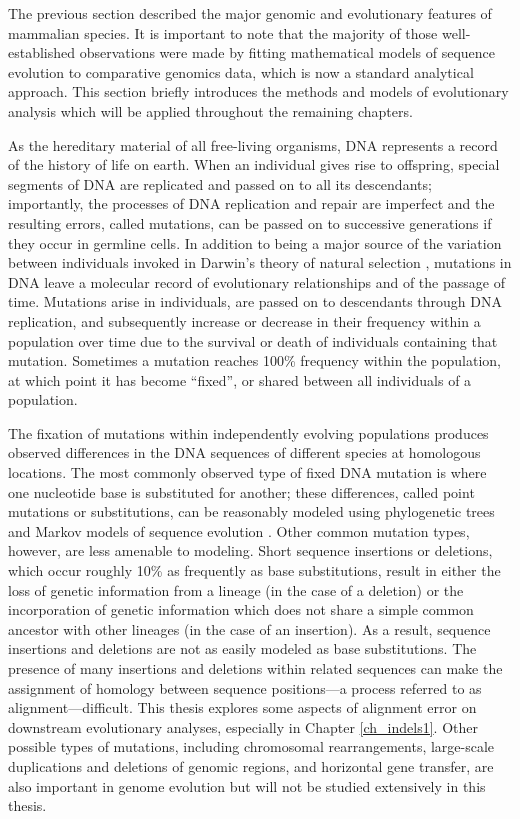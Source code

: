 The previous section described the major genomic and evolutionary
features of mammalian species. It is important to note that the
majority of those well-established observations were made by fitting
mathematical models of sequence evolution to comparative genomics
data, which is now a standard analytical approach. This section
briefly introduces the methods and models of evolutionary analysis
which will be applied throughout the remaining chapters.

As the hereditary material of all free-living organisms, DNA
represents a record of the history of life on earth. When an
individual gives rise to offspring, special segments of DNA are
replicated and passed on to all its descendants; importantly, the
processes of DNA replication and repair are imperfect
\citep{Arnheim2009} and the resulting errors, called mutations, can be
passed on to successive generations if they occur in germline
cells. In addition to being a major source of the variation between
individuals invoked in Darwin's theory of natural selection
\citep{Darwin1859a}, mutations in DNA leave a molecular record of
evolutionary relationships and of the passage of time. Mutations arise
in individuals, are passed on to descendants through DNA replication,
and subsequently increase or decrease in their frequency within a
population over time due to the survival or death of individuals
containing that mutation. Sometimes a mutation reaches 100\% frequency
within the population, at which point it has become ``fixed'', or
shared between all individuals of a population.

The fixation of mutations within independently evolving populations
produces observed differences in the DNA sequences of different
species at homologous locations. The most commonly observed type of
fixed DNA mutation is where one nucleotide base is substituted for
another; these differences, called point mutations or substitutions,
can be reasonably modeled using phylogenetic trees and Markov models
of sequence evolution \citep{Yang2006}. Other common mutation types,
however, are less amenable to modeling. Short sequence insertions or
deletions, which occur roughly 10\% as frequently as base
substitutions, result in either the loss of genetic information from a
lineage (in the case of a deletion) or the incorporation of genetic
information which does not share a simple common ancestor with other
lineages (in the case of an insertion). As a result, sequence
insertions and deletions are not as easily modeled as base
substitutions. The presence of many insertions and deletions within
related sequences can make the assignment of homology between sequence
positions---a process referred to as alignment---difficult. This
thesis explores some aspects of alignment error on downstream
evolutionary analyses, especially in Chapter \ref{ch_indels1}. Other
possible types of mutations, including chromosomal rearrangements,
large-scale duplications and deletions of genomic regions, and
horizontal gene transfer, are also important in genome evolution but
will not be studied extensively in this thesis.

